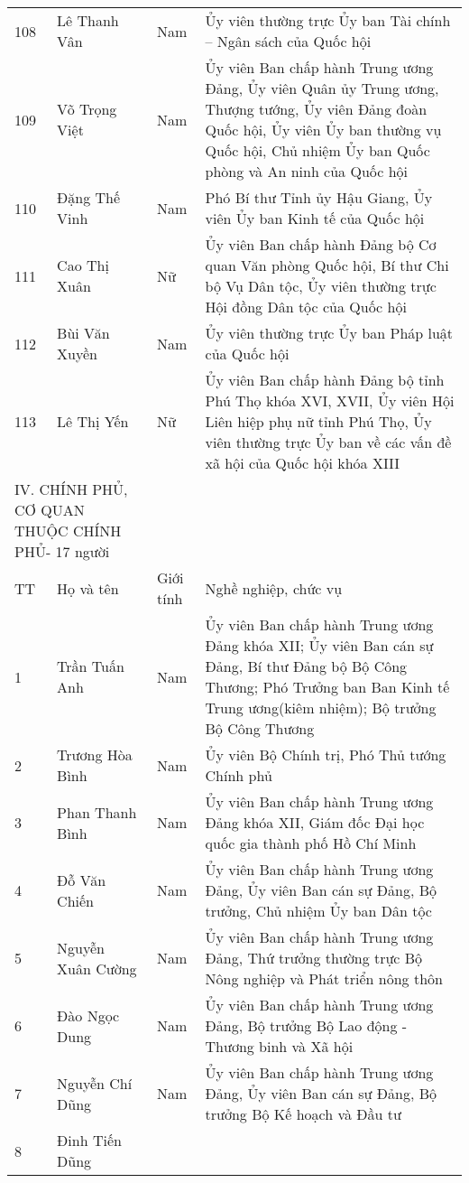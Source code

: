 \begin{longtable}{p{}p{}p{}p{}}
108 &
  Lê Thanh Vân &
  Nam &
  Ủy viên thường trực Ủy ban Tài chính – Ngân sách của Quốc hội \\
109 &
  Võ Trọng Việt &
  Nam &
  Ủy viên Ban chấp hành Trung ương Đảng, Ủy viên Quân ủy Trung ương, Thượng tướng, Ủy viên Đảng đoàn Quốc hội, Ủy viên Ủy ban thường vụ Quốc hội, Chủ nhiệm Ủy ban Quốc phòng và An ninh của Quốc hội \\
110 &
  Đặng Thế Vinh &
  Nam &
  Phó Bí thư Tỉnh ủy Hậu Giang, Ủy viên Ủy ban Kinh tế của Quốc hội \\
111 &
  Cao Thị Xuân &
  Nữ &
  Ủy viên Ban chấp hành Đảng bộ Cơ quan Văn phòng Quốc hội, Bí thư Chi bộ Vụ Dân tộc, Ủy viên thường trực Hội đồng Dân tộc của Quốc hội \\
112 &
  Bùi Văn Xuyền &
  Nam &
  Ủy viên thường trực Ủy ban Pháp luật của Quốc hội \\
113 &
  Lê Thị Yến &
  Nữ &
  Ủy viên Ban chấp hành Đảng bộ tỉnh Phú Thọ khóa XVI, XVII, Ủy viên Hội Liên hiệp phụ nữ tỉnh Phú Thọ, Ủy viên thường trực Ủy ban về các vấn đề xã hội của Quốc hội khóa XIII \\
\multicolumn{2}{l}{IV. CHÍNH PHỦ, CƠ QUAN THUỘC CHÍNH PHỦ- 17 người} &
 &
 \\
TT &
  Họ và tên &
  Giới tính &
  Nghề nghiệp, chức vụ \\
1 &
  Trần Tuấn Anh &
  Nam &
  Ủy viên Ban chấp hành Trung ương Đảng khóa XII; Ủy viên Ban cán sự Đảng, Bí thư Đảng bộ Bộ Công Thương; Phó Trưởng ban Ban Kinh tế Trung ương(kiêm nhiệm); Bộ trưởng Bộ Công Thương \\
2 &
  Trương Hòa Bình &
  Nam &
  Ủy viên Bộ Chính trị, Phó Thủ tướng Chính phủ \\
3 &
  Phan Thanh Bình &
  Nam &
  Ủy viên Ban chấp hành Trung ương Đảng khóa XII, Giám đốc Đại học quốc gia thành phố Hồ Chí Minh \\
4 &
  Đỗ Văn Chiến &
  Nam &
  Ủy viên Ban chấp hành Trung ương Đảng, Ủy viên Ban cán sự Đảng, Bộ trưởng, Chủ nhiệm Ủy ban Dân tộc \\
5 &
  Nguyễn Xuân Cường &
  Nam &
  Ủy viên Ban chấp hành Trung ương Đảng, Thứ trưởng thường trực Bộ Nông nghiệp và Phát triển nông thôn \\
6 &
  Đào Ngọc Dung &
  Nam &
  Ủy viên Ban chấp hành Trung ương Đảng, Bộ trưởng Bộ Lao động - Thương binh và Xã hội \\
7 &
  Nguyễn Chí Dũng &
  Nam &
  Ủy viên Ban chấp hành Trung ương Đảng, Ủy viên Ban cán sự Đảng, Bộ trưởng Bộ Kế hoạch và Đầu tư \\
8 &
  Đinh Tiến Dũng &

\end{longtable}

